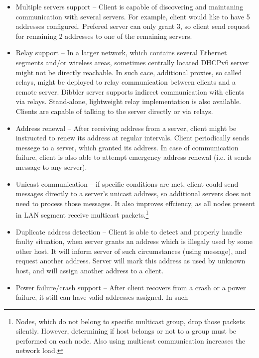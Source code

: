 \begin{itemize}
\item Multiple servers support -- Client is capable of discovering and
      maintaning communication with several servers. For example, client
      would like to have 5 addresses configured. Prefered server can
      only grant 3, so client send request for remaining 2 addresses to
      one of the remaining servers.
\item Relay support -- In a larger network, which contains several
      Ethernet segments and/or wireless areas, sometimes centrally
      located DHCPv6 server might not be directly reachable. In such
      cace, additional proxies, so called relays, might be deployed to
      relay communication between clients and a remote server. Dibbler
      server supports indirect communication with clients via
      relays. Stand-alone, lightweight relay implementation is also
      available. Clients are capable of talking to the server directly
      or via relays.
\item Address renewal -- After receiving address from a server, client
      might be instructed to renew its address at regular
      intervals. Client periodically sends  messege to a
      server, which granted its address. In case of communication
      failure, client is also able to attempt emergency address renewal
      (i.e. it sends  message to any server).
\item Unicast communication -- if specific conditions are met, client
      could send messages directly to a server's unicast address, so
      additional servers does not need to process those messages. It also
      improves effciency, as all nodes present in LAN segment receive
      multicast packets.\footnote{Nodes, which do not belong to specific
      multicast group, drop those packets silently. However, determining
      if host belongs or not to a group must be performed on each
      node. Also using multicast communication increases the network load.}
\item Duplicate address detection -- Client is able to detect and
      properly handle faulty situation, when server grants an address
      which is illegaly used by some other host. It will inform
      server of such circumstances (using  message), and
      request another address. Server will mark this address as used by
      unknown host, and will assign another address to a client.
\item Power failure/crash support -- After client recovers from a crash or
      a power failure, it still can have valid addresses assigned. In such

\end{itemize}
